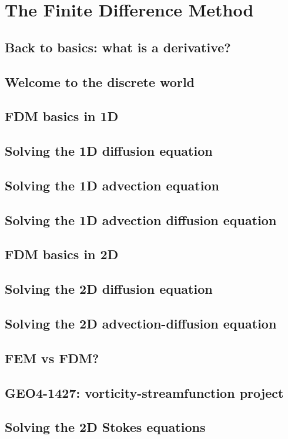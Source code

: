 \chapter{The Finite Difference Method} %

\section{Back to basics: what is a derivative?} 
\section{Welcome to the discrete world} 
\section{FDM basics in 1D} \label{ss:fdm_basics1D}  
\section{Solving the 1D diffusion equation} \label{ss:fdm_diff1D} 
\section{Solving the 1D advection equation} \label{ss:fdm_adv1D} 
\newpage
\section{Solving the 1D advection diffusion equation} 
\label{ss:fdm_advdiff1D} 
\newpage
\section{FDM basics in 2D} \label{ss:fdm_basics2D}  
\newpage
\section{Solving the 2D diffusion equation} \label{ss:fdm_diff2D} 
\section{Solving the 2D advection-diffusion equation} \label{ss:fdm_advdiff2D} 

\newpage
\section{FEM vs FDM?}\label{ss:femvsfdm}   
\newpage
\section{GEO4-1427: vorticity-streamfunction project} 
\newpage
\section{Solving the 2D Stokes equations} \label{ss:fdm_stokes2D} 

